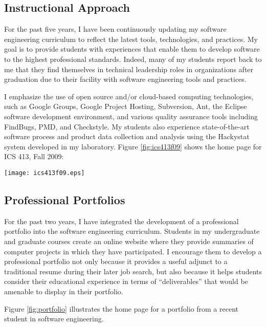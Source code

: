 \documentclass[11pt]{article}
\begin{document}
\subsection{Instructional Approach}

For the past five years, I have been continuously updating my software
engineering curriculum to reflect the latest tools, technologies, and
practices.  My goal is to provide students with experiences that enable
them to develop software to the highest professional standards.  Indeed,
many of my students report back to me that they find themselves in
technical leadership roles in organizations after graduation due to their
facility with software engineering tools and practices.

I emphasize the use of open source and/or cloud-based computing
technologies, such as Google Groups, Google Project Hosting, Subversion,
Ant, the Eclipse software development environment, and various quality
assurance tools including FindBugs, PMD, and Checkstyle.  My students also
experience state-of-the-art software process and product data collection
and analysis using the Hackystat system developed in my laboratory.  Figure
\ref{fig:ics413f09} shows the home page for ICS 413, Fall 2009:

 \begin{figure*}[ht]
  \center
  \texttt{[image: ics413f09.eps]}
  \caption{ICS 413, Fall 2009 Home Page}
  \label{fig:ics413f09}
\end{figure*}  

\subsection{Professional Portfolios}

For the past two years, I have integrated the development of a professional
portfolio into the software engineering curriculum.   Students in my
undergraduate and graduate courses create an online website where they
provide summaries of computer projects in which they have participated.
I encourage them to develop a professional portfolio not only because it
provides a useful adjunct to a traditional resume during their later job
search, but also because it helps students consider their educational
experience in terms of ``deliverables'' that would be amenable to display
in their portfolio.   

Figure \ref{fig:portfolio} illustrates the home page for a portfolio from a
recent student in software engineering.
\end{document}
